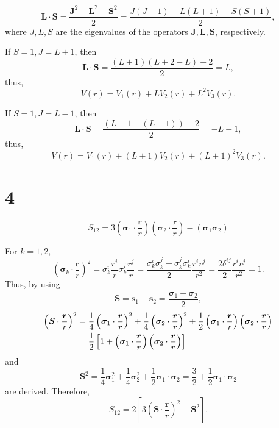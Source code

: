 \documentclass[a4paper,11pt]{jsarticle}
\begin{document}
\begin{equation}
  \mathbf{L}\cdot \mathbf{S} = \frac{\mathbf{J}^2 - \mathbf{L}^2 - \mathbf{S}^2}{2} = \frac{J(J+1)-L(L+1)-S(S+1)}{2},
\end{equation}
where $J,L,S$ are the eigenvalues of the operators $\mathbf{J,L,S}$, respectively. 

If $S=1, J=L+1$, then
\begin{equation}
  \mathbf{L}\cdot\mathbf{S} = \frac{(L+1)(L+2-L)-2}{2} = L,
\end{equation}
thus,
\begin{equation}
  V(r) = V_1(r) + L V_2(r) + L^2 V_3(r).
\end{equation}

If $S=1, J=L-1$, then
\begin{equation}
  \mathbf{L}\cdot\mathbf{S} = \frac{(L-1-(L+1))-2}{2} = -L-1,
\end{equation}
thus,
\begin{equation}
  V(r) = V_1(r) + (L+1) V_2(r) + (L+1)^2 V_3(r).
\end{equation}

\section*{4}
\begin{equation}
  S_{12} = 3\left(\bm{\sigma}_1\cdot \frac{\bm{r}}{r}\right)\left(\bm{\sigma}_2\cdot \frac{\bm{r}}{r}\right) - \left(\bm{\sigma}_1 \bm{\sigma}_2\right)
\end{equation}

For $k=1,2$,
\begin{equation}
  \left(\bm{\sigma}_k \cdot \frac{\bm{r}}{r}\right)^2 = \sigma_k^i\frac{r^i}{r}\sigma_k^j\frac{r^j}{r} = \frac{\sigma_k^i\sigma_k^j+\sigma_k^j\sigma_k^i}{2}\frac{r^ir^j}{r^2} = \frac{2\delta^{ij}}{2}\frac{r^ir^j}{r^2} = 1.
\end{equation}
Thus, by using
\begin{equation}
  \bm{S} = \bm{s}_1 + \bm{s}_2 = \frac{\bm{\sigma}_1 + \bm{\sigma}_2}{2},
\end{equation}
\begin{align}
  \left(\bm{S}\cdot \frac{\bm{r}}{r}\right)^2 &= \frac{1}{4}\left(\bm{\sigma}_1\cdot \frac{\bm{r}}{r}\right)^2 + \frac{1}{4}\left(\bm{\sigma}_2\cdot \frac{\bm{r}}{r}\right)^2 + \frac{1}{2}\left(\bm{\sigma}_1\cdot \frac{\bm{r}}{r}\right)\left(\bm{\sigma}_2\cdot \frac{\bm{r}}{r}\right) \notag\\
  &= \frac{1}{2}\left[1+\left(\bm{\sigma}_1\cdot \frac{\bm{r}}{r}\right)\left(\bm{\sigma}_2\cdot \frac{\bm{r}}{r}\right)\right]
\end{align}
and
\begin{equation}
  \bm{S}^2 = \frac{1}{4}\bm{\sigma}_1^2 + \frac{1}{4}\bm{\sigma}_2^2 + \frac{1}{2}\bm{\sigma}_1\cdot \bm{\sigma}_2 = \frac{3}{2} + \frac{1}{2}\bm{\sigma}_1\cdot \bm{\sigma}_2
\end{equation}
are derived.
Therefore, 
\begin{equation}
  S_{12} = 2\left[3\left(\bm{S}\cdot \frac{\bm{r}}{r}\right)^2 - \bm{S}^2\right].
\end{equation}
\end{document}
